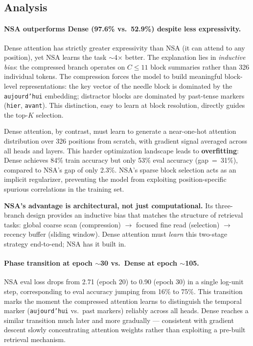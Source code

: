 \documentclass[10pt,twocolumn]{article}
\begin{document}
\subsection{Analysis}

\paragraph{NSA outperforms Dense (97.6\% vs.\ 52.9\%) despite less expressivity.}
Dense attention has strictly greater expressivity than NSA (it can attend to any position),
yet NSA learns the task $\sim$4$\times$ better.
The explanation lies in \emph{inductive bias}: the compressed branch operates on
$C \leq 11$ block summaries rather than 326 individual tokens.
The compression forces the model to build meaningful block-level representations:
the key vector of the needle block is dominated by the \texttt{aujourd'hui} embedding;
distractor blocks are dominated by past-tense markers (\texttt{hier}, \texttt{avant}).
This distinction, easy to learn at block resolution, directly guides the top-$K$ selection.

Dense attention, by contrast, must learn to generate a near-one-hot attention
distribution over 326 positions from scratch, with gradient signal averaged across all
heads and layers. This harder optimization landscape leads to \textbf{overfitting}:
Dense achieves 84\% train accuracy but only 53\% eval accuracy (gap~=~31\%),
compared to NSA's gap of only 2.3\%.
NSA's sparse block selection acts as an implicit regularizer, preventing the model
from exploiting position-specific spurious correlations in the training set.

\begin{takeaway}
\textbf{NSA's advantage is architectural, not just computational.}
Its three-branch design provides an inductive bias that matches the structure
of retrieval tasks: global coarse scan (compression) $\to$ focused fine read (selection)
$\to$ recency buffer (sliding window). Dense attention must \emph{learn} this
two-stage strategy end-to-end; NSA has it built in.
\end{takeaway}

\paragraph{Phase transition at epoch $\sim$30 vs.\ Dense at epoch $\sim$105.}
NSA eval loss drops from 2.71 (epoch 20) to 0.90 (epoch 30) in a single log-unit step,
corresponding to eval accuracy jumping from 16\% to 75\%.
This transition marks the moment the compressed attention learns to distinguish the
temporal marker (\texttt{aujourd'hui} vs.\ past markers) reliably across all heads.
Dense reaches a similar transition much later and more gradually — consistent with
gradient descent slowly concentrating attention weights rather than exploiting
a pre-built retrieval mechanism.
\end{document}
